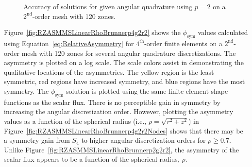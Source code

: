 \documentclass[12pt]{article}
\begin{document}
\begin{figure}[!htb]
\centering
{}
\caption{Accuracy of solutions for given angular quadrature using $p=2$ on a $2^\text{nd}$-order mesh with 120 zones.}
\label{fig:RZASMMSLinearRhoBrunnerp2g2r2Accuracy}
\end{figure}

\FloatBarrier

Figure~\ref{fig:RZASMMSLinearRhoBrunnerp4g2r2} shows the $\phi_\text{sym}$ values calculated using Equation~\ref{eq:RelativeAsymmetry} for $4^\text{th}$-order finite elements on a $2^\text{nd}$-order mesh with 120 zones for several angular quadrature discretizations. The asymmetry is plotted on a log scale. The scale colors assist in demonstrating the qualitative locations of the asymmetries. The yellow region is the least symmetric, red regions have increased symmetry, and blue regions have the most symmetry. The $\phi_\text{sym}$ solution is plotted using the same finite element shape functions as the scalar flux. There is no perceptible gain in symmetry by increasing the angular discretization order. However, plotting the asymmetry values as a function of the spherical radius (i.e., $\rho=\sqrt{r^2+z^2}$) in Figure~\ref{fig:RZASMMSLinearRhoBrunnerp4g2r2Nodes} shows that there may be a symmetry gain from $S_4$ to higher angular discretization orders for $\rho \geq 0.7$. Unlike Figure~\ref{fig:RZASMMSLinearRhoBrunnerp2g2r2}, the asymmetry of the scalar flux appears to be a function of the spherical radius, $\rho$.
\end{document}
